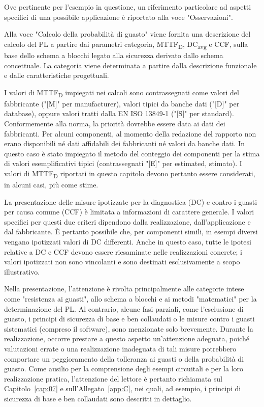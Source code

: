 Ove pertinente per l'esempio in questione, un riferimento particolare ad aspetti specifici di una possibile applicazione è riportato alla voce "Osservazioni".

Alla voce "Calcolo della probabilità di guasto" viene fornita una descrizione del calcolo del PL a partire dai parametri categoria, MTTF\textsubscript{D}, DC\textsubscript{avg} e CCF, sulla base dello schema a blocchi legato alla sicurezza derivato dallo schema concettuale. La categoria viene determinata a partire dalla descrizione funzionale e dalle caratteristiche progettuali.

I valori di MTTF\textsubscript{D} impiegati nei calcoli sono contrassegnati come valori del fabbricante ("[M]" per manufacturer), valori tipici da banche dati ("[D]" per database), oppure valori tratti dalla EN ISO 13849-1 ("[S]" per standard). Conformemente alla norma, la priorità dovrebbe essere data ai dati dei fabbricanti. Per alcuni componenti, al momento della redazione del rapporto non erano disponibili né dati affidabili dei fabbricanti né valori da banche dati. In questo caso è stato impiegato il metodo del conteggio dei componenti per la stima di valori esemplificativi tipici (contrassegnati "[E]" per estimated, stimato). I valori di MTTF\textsubscript{D} riportati in questo capitolo devono pertanto essere considerati, in alcuni casi, più come stime.

La presentazione delle misure ipotizzate per la diagnostica (DC) e contro i guasti per causa comune (CCF) è limitata a informazioni di carattere generale. I valori specifici per questi due criteri dipendono dalla realizzazione, dall'applicazione e dal fabbricante. È pertanto possibile che, per componenti simili, in esempi diversi vengano ipotizzati valori di DC differenti. Anche in questo caso, tutte le ipotesi relative a DC e CCF devono essere riesaminate nelle realizzazioni concrete; i valori ipotizzati non sono vincolanti e sono destinati esclusivamente a scopo illustrativo.

Nella presentazione, l'attenzione è rivolta principalmente alle categorie intese come "resistenza ai guasti", allo schema a blocchi e ai metodi "matematici" per la determinazione del PL. Al contrario, alcune fasi parziali, come l'esclusione di guasto, i principi di sicurezza di base e ben collaudati o le misure contro i guasti sistematici (compreso il software), sono menzionate solo brevemente. Durante la realizzazione, occorre prestare a questo aspetto un'attenzione adeguata, poiché valutazioni errate o una realizzazione inadeguata di tali misure potrebbero comportare un peggioramento della tolleranza ai guasti o della probabilità di guasto. Come ausilio per la comprensione degli esempi circuitali e per la loro realizzazione pratica, l'attenzione del lettore è pertanto richiamata sul Capitolo~\ref{cap:07} e sull'Allegato~\ref{app:C}, nei quali, ad esempio, i principi di sicurezza di base e ben collaudati sono descritti in dettaglio.

